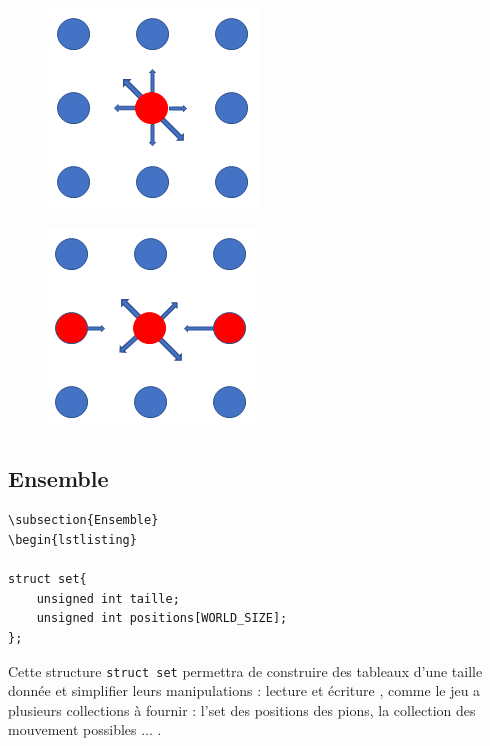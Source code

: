 \documentclass[a4paper]{article}
\begin{document}
  \begin{figure}
    \centering
    \begin{minipage}{.5\textwidth}
      \centering
      \includegraphics[width=.4\linewidth]{3.png}
      \label{fig:test1}
    \end{minipage}%
    \begin{minipage}{.5\textwidth}
      \centering
      \includegraphics[width=.4\linewidth]{4.png}
      \label{fig:test2}
    \end{minipage}
    \end{figure}

\subsection{Ensemble}
\begin{lstlisting}
\subsection{Ensemble}
\begin{lstlisting}

struct set{
    unsigned int taille;
    unsigned int positions[WORLD_SIZE];
};
\end{lstlisting}
Cette structure \lstinline|struct set|  permettra de construire des tableaux d’une taille donnée et simplifier leurs 
manipulations : lecture et écriture , comme le jeu a plusieurs collections à fournir : l’set des positions des pions, la 
collection des mouvement possibles  ... . 
\end{document}
